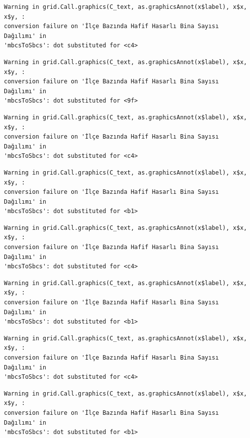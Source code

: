 \documentclass[
  11pt,
  a4paper,
  DIV=11,
  numbers=noendperiod]{scrartcl}
\begin{document}
\begin{verbatim}
Warning in grid.Call.graphics(C_text, as.graphicsAnnot(x$label), x$x, x$y, :
conversion failure on 'İlçe Bazında Hafif Hasarlı Bina Sayısı Dağılımı' in
'mbcsToSbcs': dot substituted for <c4>
\end{verbatim}

\begin{verbatim}
Warning in grid.Call.graphics(C_text, as.graphicsAnnot(x$label), x$x, x$y, :
conversion failure on 'İlçe Bazında Hafif Hasarlı Bina Sayısı Dağılımı' in
'mbcsToSbcs': dot substituted for <9f>
\end{verbatim}

\begin{verbatim}
Warning in grid.Call.graphics(C_text, as.graphicsAnnot(x$label), x$x, x$y, :
conversion failure on 'İlçe Bazında Hafif Hasarlı Bina Sayısı Dağılımı' in
'mbcsToSbcs': dot substituted for <c4>
\end{verbatim}

\begin{verbatim}
Warning in grid.Call.graphics(C_text, as.graphicsAnnot(x$label), x$x, x$y, :
conversion failure on 'İlçe Bazında Hafif Hasarlı Bina Sayısı Dağılımı' in
'mbcsToSbcs': dot substituted for <b1>
\end{verbatim}

\begin{verbatim}
Warning in grid.Call.graphics(C_text, as.graphicsAnnot(x$label), x$x, x$y, :
conversion failure on 'İlçe Bazında Hafif Hasarlı Bina Sayısı Dağılımı' in
'mbcsToSbcs': dot substituted for <c4>
\end{verbatim}

\begin{verbatim}
Warning in grid.Call.graphics(C_text, as.graphicsAnnot(x$label), x$x, x$y, :
conversion failure on 'İlçe Bazında Hafif Hasarlı Bina Sayısı Dağılımı' in
'mbcsToSbcs': dot substituted for <b1>
\end{verbatim}

\begin{verbatim}
Warning in grid.Call.graphics(C_text, as.graphicsAnnot(x$label), x$x, x$y, :
conversion failure on 'İlçe Bazında Hafif Hasarlı Bina Sayısı Dağılımı' in
'mbcsToSbcs': dot substituted for <c4>
\end{verbatim}

\begin{verbatim}
Warning in grid.Call.graphics(C_text, as.graphicsAnnot(x$label), x$x, x$y, :
conversion failure on 'İlçe Bazında Hafif Hasarlı Bina Sayısı Dağılımı' in
'mbcsToSbcs': dot substituted for <b1>
\end{verbatim}
\end{document}
